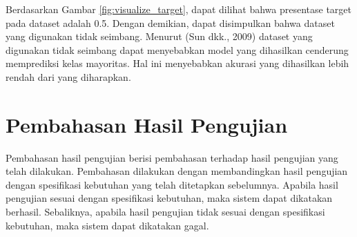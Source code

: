 Berdasarkan Gambar \ref{fig:visualize_target}, dapat dilihat bahwa presentase target pada dataset adalah 0.5. Dengan demikian, dapat disimpulkan bahwa dataset yang digunakan tidak seimbang. Menurut (Sun dkk., 2009) dataset yang digunakan tidak seimbang dapat menyebabkan model yang dihasilkan cenderung memprediksi kelas mayoritas. Hal ini menyebabkan akurasi yang dihasilkan lebih rendah dari yang diharapkan.





\section{Pembahasan Hasil Pengujian}
Pembahasan hasil pengujian berisi pembahasan terhadap hasil pengujian yang telah dilakukan. Pembahasan dilakukan dengan membandingkan hasil pengujian dengan spesifikasi kebutuhan yang telah ditetapkan sebelumnya. Apabila hasil pengujian sesuai dengan spesifikasi kebutuhan, maka sistem dapat dikatakan berhasil. Sebaliknya, apabila hasil pengujian tidak sesuai dengan spesifikasi kebutuhan, maka sistem dapat dikatakan gagal.
